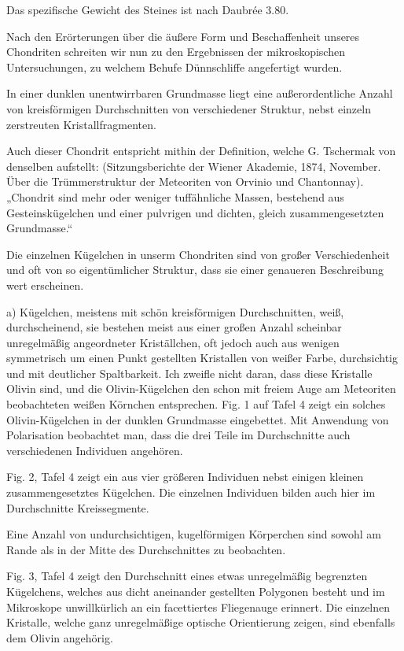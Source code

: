 \documentclass[a4paper, 11pt, oneside]{article}
\begin{document}
Das spezifische Gewicht des Steines ist nach Daubrée 3.80.

Nach den Erörterungen über die äußere Form und Beschaffenheit unseres Chondriten schreiten wir nun zu den Ergebnissen der mikroskopischen Untersuchungen, zu welchem Behufe Dünnschliffe angefertigt wurden.

In einer dunklen unentwirrbaren Grundmasse liegt eine außerordentliche Anzahl von kreisförmigen Durchschnitten von verschiedener Struktur, nebst einzeln zerstreuten Kristallfragmenten.

Auch dieser Chondrit entspricht mithin der Definition, welche G. Tschermak von denselben aufstellt: (Sitzungsberichte der Wiener Akademie, 1874, November. Über die Trümmerstruktur der Meteoriten von Orvinio und Chantonnay). „Chondrit sind mehr oder weniger tuffähnliche Massen, bestehend aus Gesteinskügelchen und einer pulvrigen und dichten, gleich zusammengesetzten Grundmasse.“

Die einzelnen Kügelchen in unserm Chondriten sind von großer Verschiedenheit und oft von so eigentümlicher Struktur, dass sie einer genaueren Beschreibung wert erscheinen.

a) Kügelchen, meistens mit schön kreisförmigen Durchschnitten, weiß, durchscheinend, sie bestehen meist aus einer großen Anzahl scheinbar unregelmäßig angeordneter Kriställchen, oft jedoch auch aus wenigen symmetrisch um einen Punkt gestellten Kristallen von weißer Farbe, durchsichtig und mit deutlicher Spaltbarkeit. Ich zweifle nicht daran, dass diese Kristalle Olivin sind, und die Olivin-Kügelchen den schon mit freiem Auge am Meteoriten beobachteten weißen Körnchen entsprechen. Fig. 1 auf Tafel 4 zeigt ein solches Olivin-Kügelchen in der dunklen Grundmasse eingebettet. Mit Anwendung von Polarisation beobachtet man, dass die drei Teile im Durchschnitte auch verschiedenen Individuen angehören.

Fig. 2, Tafel 4 zeigt ein aus vier größeren Individuen nebst einigen kleinen zusammengesetztes Kügelchen. Die einzelnen Individuen bilden auch hier im Durchschnitte Kreissegmente.

Eine Anzahl von undurchsichtigen, kugelförmigen Körperchen sind sowohl am Rande als in der Mitte des Durchschnittes zu beobachten.

Fig. 3, Tafel 4 zeigt den Durchschnitt eines etwas unregelmäßig begrenzten Kügelchens, welches aus dicht aneinander gestellten Polygonen besteht und im Mikroskope unwillkürlich an ein facettiertes Fliegenauge erinnert. Die einzelnen Kristalle, welche ganz unregelmäßige optische Orientierung zeigen, sind ebenfalls dem Olivin angehörig.
\end{document}
